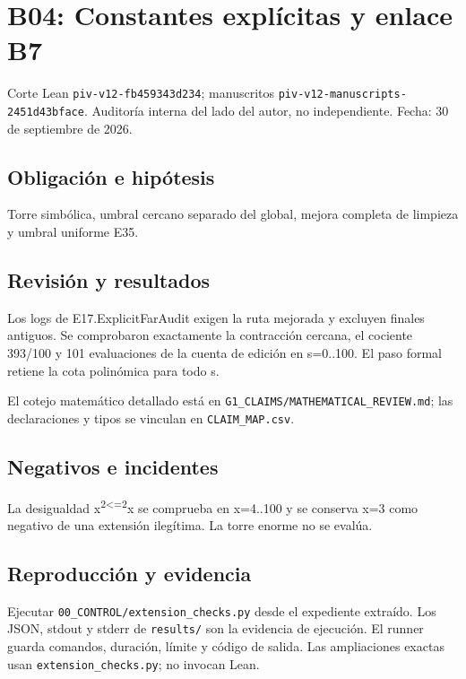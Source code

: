 \documentclass[11pt]{article}
\begin{document}
\section{B04: Constantes explícitas y enlace
B7}\label{b04-constantes-expluxedcitas-y-enlace-b7}

Corte Lean \nolinkurl{piv-v12-fb459343d234}; manuscritos
\nolinkurl{piv-v12-manuscripts-2451d43bface}. Auditoría interna del lado
del autor, no independiente. Fecha: 30 de septiembre de 2026.

\subsection{Obligación e hipótesis}\label{obligaciuxf3n-e-hipuxf3tesis}

Torre simbólica, umbral cercano separado del global, mejora completa de
limpieza y umbral uniforme E35.

\subsection{Revisión y resultados}\label{revisiuxf3n-y-resultados}

Los logs de E17.ExplicitFarAudit exigen la ruta mejorada y excluyen
finales antiguos. Se comprobaron exactamente la contracción cercana, el
cociente 393/100 y 101 evaluaciones de la cuenta de edición en s=0..100.
El paso formal retiene la cota polinómica para todo s.

El cotejo matemático detallado está en
\nolinkurl{G1_CLAIMS/MATHEMATICAL_REVIEW.md}; las declaraciones y tipos
se vinculan en \nolinkurl{CLAIM_MAP.csv}.

\subsection{Negativos e incidentes}\label{negativos-e-incidentes}

La desigualdad x\textsuperscript{2\textless=2}x se comprueba en x=4..100
y se conserva x=3 como negativo de una extensión ilegítima. La torre
enorme no se evalúa.

\subsection{Reproducción y evidencia}\label{reproducciuxf3n-y-evidencia}

Ejecutar \nolinkurl{00_CONTROL/extension_checks.py} desde el expediente
extraído. Los JSON, stdout y stderr de \nolinkurl{results/} son la
evidencia de ejecución. El runner guarda comandos, duración, límite y
código de salida. Las ampliaciones exactas usan
\nolinkurl{extension_checks.py}; no invocan Lean.
\end{document}
